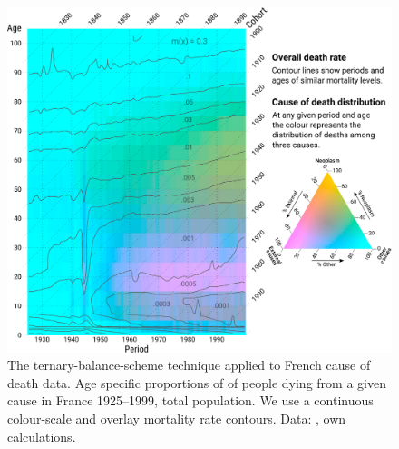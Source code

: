 \documentclass[parskip=half]{scrartcl}
\begin{document}
\begin{appendix}
\begin{figure}[!htb]
  \centering
  \includegraphics[width = \textwidth]{./fig/tern_balance_cont.pdf}
  \caption{The ternary-balance-scheme technique applied to French cause of death data. Age specific proportions of of people dying from a given cause in France 1925--1999, total population. We use a continuous colour-scale and overlay mortality rate contours. Data: \cite{Vallin2014}, own calculations.}
  \label{fig:tbs_cont}
\end{figure}

\end{appendix}
\end{document}
